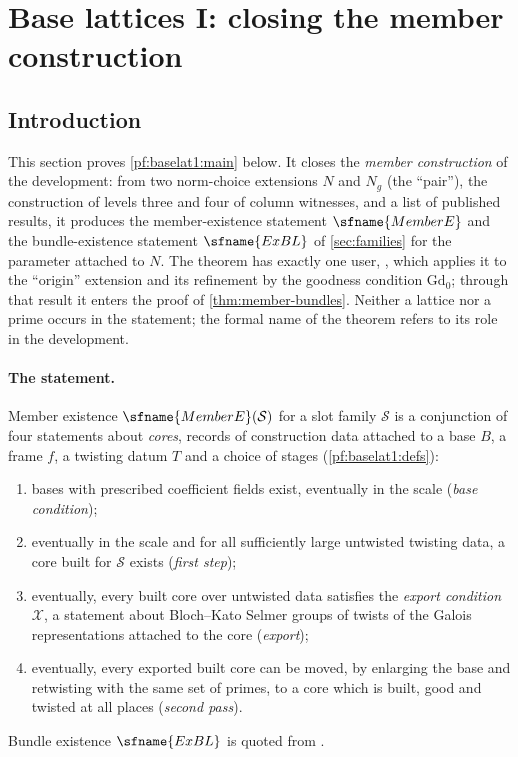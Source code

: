 \section{Base lattices I: closing the member construction}\label{sec:pf:baselat1}

\providecommand{\baselatoneS}{\mathcal S}
\providecommand{\baselatoneP}{\mathfrak p}
\providecommand{\baselatoneO}{\mathcal O}
\providecommand{\baselatoneLam}{\Lambda}
\providecommand{\baselatonenv}{\operatorname{nv}}
\providecommand{\baselatoneun}{T^{\mathrm{untw}}}

\subsection{Introduction}\label{pf:baselat1:intro}

This section proves \cref{pf:baselat1:main} below. It closes the \emph{member construction} of the
development: from two norm-choice extensions $N$ and $N_g$ (the ``pair''), the construction of levels
three and four of column witnesses, and a list of published results, it produces the member-existence
statement $\sfname{MemberE}$ and the bundle-existence statement $\sfname{ExBL}$ of
\cref{sec:families} for the parameter attached to $N$. The theorem has exactly one user,
, which applies it to the ``origin''
extension and its refinement by the goodness condition $\mathrm{Gd}_0$; through that result it enters the
proof of \cref{thm:member-bundles}. Neither a lattice nor a prime occurs in the statement; the formal name
of the theorem refers to its role in the development.

\paragraph{The statement.} Member existence $\sfname{MemberE}(\baselatoneS)$ for a slot family
$\baselatoneS$ is a conjunction of four statements about \emph{cores}, records of construction data
attached to a base $B$, a frame $f$, a twisting datum $T$ and a choice of stages
(\cref{pf:baselat1:defs}):
\begin{enumerate}[label=(M\arabic*)]
\item bases with prescribed coefficient fields exist, eventually in the scale (\emph{base condition});
\item eventually in the scale and for all sufficiently large untwisted twisting data, a core built for
  $\baselatoneS$ exists (\emph{first step});
\item eventually, every built core over untwisted data satisfies the \emph{export condition}
  $\mathcal{X}$, a statement about Bloch--Kato Selmer groups of twists of the Galois
  representations attached to the core (\emph{export});
\item eventually, every exported built core can be moved, by enlarging the base and retwisting with the
  same set of primes, to a core which is built, good and twisted at all places (\emph{second pass}).
\end{enumerate}
Bundle existence $\sfname{ExBL}$ is quoted from .

